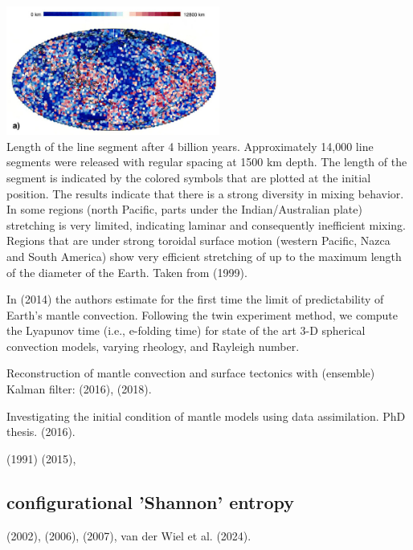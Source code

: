 \begin{center}
\includegraphics[width=7cm]{images/mixing/vazh99b}\\
{\captionfont Length
of the line segment after 4 billion years. Approximately 14,000 line segments were released with 
regular spacing at 1500 km depth. The length of the segment is indicated by the colored symbols 
that are plotted at the initial position. The results indicate that there is a strong
diversity in mixing behavior. In some regions (north Pacific, parts under the Indian/Australian plate) 
stretching is very limited, indicating laminar and consequently inefficient mixing. Regions that 
are under strong toroidal surface motion (western Pacific, Nazca and South
America) show very efficient stretching of up to the maximum length of the diameter of the Earth. 
Taken from \textcite{vazh99} (1999).}
\end{center}


In \textcite{becr14} (2014) the authors estimate for the ﬁrst time the limit of predictability of Earth’s
mantle convection. Following the twin experiment method, we compute the Lyapunov time (i.e., e-folding
time) for state of the art 3-D spherical convection models, varying rheology, and Rayleigh number.


Reconstruction of mantle convection and surface tectonics with (ensemble) Kalman filter:
\textcite{bocf16} (2016),
\textcite{bofc18} (2018).

Investigating the initial condition
of mantle models using data assimilation. PhD thesis. \textcite{pric16} (2016).


\Literature

\textcite{pier91} (1991)
\textcite{cobs15} (2015),

\subsection{configurational 'Shannon' entropy}

\textcite{gobo02} (2002), 
\textcite{cakm06} (2006),
\textcite{nake07} (2007), 
van der Wiel et al. (2024). 

